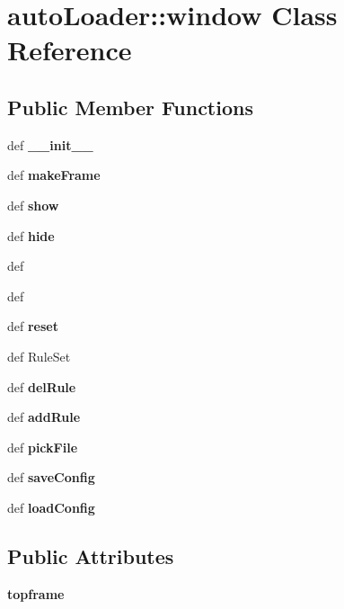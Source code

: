 \section{auto\-Loader::window Class Reference}
\label{classautoLoader_1_1window}
\subsection*{Public Member Functions}
\begin{CompactItemize}
\item 
def {\bf\_\-\_\-init\_\-\_\-}
\item 
def \textbf{make\-Frame}\label{classautoLoader_1_1window_3118bba3001fcb0b270a1c3d2a29a6bb}

\item 
def \textbf{show}\label{classautoLoader_1_1window_1ffbf23a2106138a9f6144460aeb5bbf}

\item 
def \textbf{hide}\label{classautoLoader_1_1window_fbb1e5df3f8eea618a22d80f077e5288}

\item 
def {\bfreadentries}
\item 
def {\bfwriteentries}
\item 
def \textbf{reset}\label{classautoLoader_1_1window_ebd2bb75453b65cf2c5c627893f81f9a}

\item 
def {\bftest\-Rule\-Set}
\item 
def \textbf{del\-Rule}\label{classautoLoader_1_1window_7d6be5c803fa09e4f77b0530320cbe29}

\item 
def \textbf{add\-Rule}\label{classautoLoader_1_1window_1a222201b5a73af6a0447cbbb5cf8e03}

\item 
def \textbf{pick\-File}\label{classautoLoader_1_1window_e5678fcb23c6cfb13079d0dcab545654}

\item 
def \textbf{save\-Config}\label{classautoLoader_1_1window_ac7f28121ad44fea4ae78c97ea7d0c15}

\item 
def \textbf{load\-Config}\label{classautoLoader_1_1window_10cd0a27f8527999abf07747c7baf0cf}

\end{CompactItemize}
\subsection*{Public Attributes}
\begin{CompactItemize}
\item 
\textbf{topframe}\label{classautoLoader_1_1window_ed443f71b4f4ade6f64cea9f1ce46117}

\end{CompactItemize}


